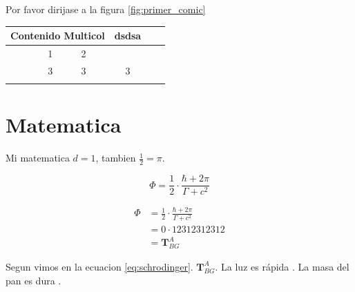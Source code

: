 \documentclass[titlepage]{article}
\begin{document}
Por favor dirijase a la figura \ref{fig:primer_comic}


\begin{table}[h!]
\centering
\begin{tabular}{rc|c|cc} %
\multicolumn{2}{c}{Contenido Multicol}  & \textbf{dsdsa} & \textbf{} &  \\ \hline 
1             & 2               &                &           &  \\
3             & 3               & 3              &           &  \\
              &                 &                &           & 
\end{tabular}
\end{table}

\section{Matematica}
Mi matematica $d=1$, tambien $\frac{1}{2} = \pi$. 

\begin{equation} \label{eq:schrodinger}
    \Phi =  \frac{1}{2} \cdot \frac{\hbar + 2\pi }{\Gamma + c^{2} }
\end{equation}

\newcommand{\transform}[3]{ \ensuremath{\mathbf{T}^{#1}_{#2#3}}}

\begin{align}
    \Phi &=  \frac{1}{2} \cdot \frac{\hbar + 2\pi }{\Gamma + c^{2} } \\
    & = 0 \cdot 12312312312 \\
    & = \transform{A}{B}{G}
\end{align}

Segun vimos en la ecuacion \ref{eq:schrodinger}. \transform{A}{B}{G}. La luz es rápida \citep{serway}. La masa del pan es dura \cite{kawai}.



\end{document}
